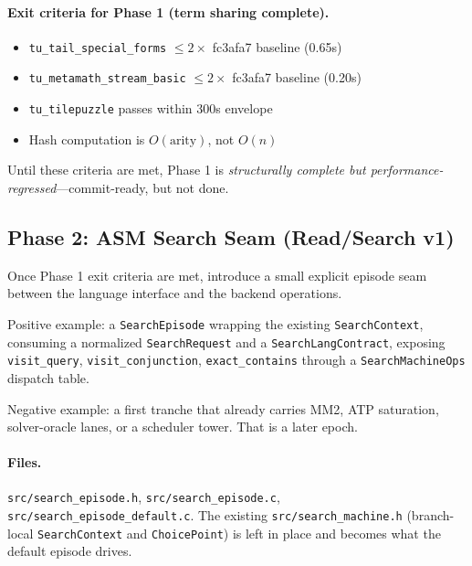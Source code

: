 \documentclass[11pt]{article}
\newcommand{\code}[1]{\texttt{#1}}
\begin{document}
\paragraph{Exit criteria for Phase 1 (term sharing complete).}
\begin{itemize}
\item \code{tu\_tail\_special\_forms} $\leq 2\times$ fc3afa7 baseline (0.65s)
\item \code{tu\_metamath\_stream\_basic} $\leq 2\times$ fc3afa7 baseline (0.20s)
\item \code{tu\_tilepuzzle} passes within 300s envelope
\item Hash computation is $O(\mathrm{arity})$, not $O(n)$
\end{itemize}

Until these criteria are met, Phase 1 is \emph{structurally complete but
performance-regressed}---commit-ready, but not done.

\subsection{Phase 2: ASM Search Seam (Read/Search v1)}

Once Phase 1 exit criteria are met, introduce a small explicit episode
seam between the language interface and the backend operations.

Positive example: a \code{SearchEpisode} wrapping the existing
\code{SearchContext}, consuming a normalized \code{SearchRequest} and a
\code{SearchLangContract}, exposing \code{visit\_query},
\code{visit\_conjunction}, \code{exact\_contains} through a
\code{SearchMachineOps} dispatch table.

Negative example: a first tranche that already carries MM2, ATP
saturation, solver-oracle lanes, or a scheduler tower.  That is a
later epoch.

\paragraph{Files.}
\code{src/search\_episode.h}, \code{src/search\_episode.c},
\code{src/search\_episode\_default.c}.  The existing
\code{src/search\_machine.h} (branch-local \code{SearchContext} and
\code{ChoicePoint}) is left in place and becomes what the default
episode drives.
\end{document}
